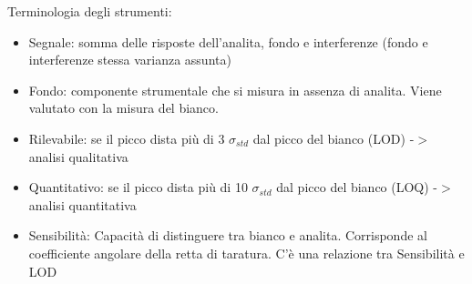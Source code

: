 \documentclass{article}
\begin{document}
%
Terminologia degli strumenti:
\begin{itemize}
	\item Segnale: somma delle risposte dell'analita, fondo e interferenze (fondo e interferenze stessa varianza assunta)
	\item Fondo: componente strumentale che si misura in assenza di analita. Viene valutato con la misura del bianco.
	\item Rilevabile: se il picco dista più di 3 $\sigma_{std}$ dal picco del bianco (LOD) -$>$ analisi qualitativa
	\item Quantitativo: se il picco dista più di 10 $\sigma_{std}$ dal picco del bianco (LOQ) -$>$ analisi quantitativa
	\item Sensibilità: Capacità di distinguere tra bianco e analita. Corrisponde al coefficiente angolare della retta di taratura. C'è una relazione tra Sensibilità e LOD 
\end{itemize}
\hrulefill
\end{document}
